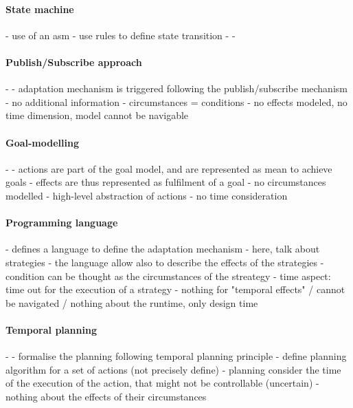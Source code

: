 \paragraph{State machine}
- \cite{DBLP:conf/icse/ArcainiRS15} use of an \gls{asm}
	- use rules to define state transition
- \cite{DBLP:conf/icse/IftikharW14a}
- \cite{DBLP:conf/smartgridsec/0001FKNT14}
		 
\paragraph{Publish/Subscribe approach}
- \cite{DBLP:conf/icse/BarbosaLMJ17}
	- adaptation mechanism is triggered following the publish/subscribe mechanism
	- no additional information
	- circumstances = conditions
	- no effects modeled, no time dimension, model cannot be navigable
	
\paragraph{Goal-modelling}
- \cite{DBLP:conf/icse/MendoncaAR14, DBLP:conf/iceccs/BencomoWSW12}
	- actions are part of the goal model, and are represented as mean to achieve goals
	- effects are thus represented as fulfilment of a goal
	- no circumstances modelled
	- high-level abstraction of actions
	- no time consideration
	
\paragraph{Programming language}
- \cite{DBLP:journals/jss/ChengG12} defines a language to define the adaptation mechanism
	- here, talk about strategies
	- the language allow also to describe the effects of the strategies 
	- condition can be thought as the circumstances of the streategy
	- time aspect: time out for the execution of a strategy
	- nothing for "temporal effects" / cannot be navigated / nothing about the runtime, only design time
	
\paragraph{Temporal planning}
- \cite{DBLP:conf/aaai/CimattiMR15}
	- formalise the planning following temporal planning principle
	- define planning algorithm for a set of actions (not precisely define)
	- planning consider the time of the execution of the action, that might not be controllable (uncertain)
	- nothing about the effects of their circumstances
	 
